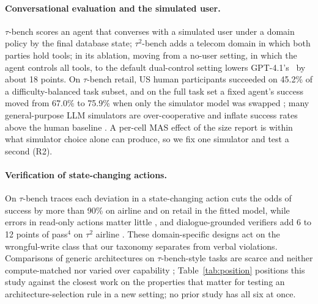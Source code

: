 \paragraph{Conversational evaluation and the simulated user.} $\tau$-bench \citep{yao2024tau} scores an agent that converses with a simulated user under a domain policy by the final database state; $\tau^2$-bench \citep{barres2025tau2} adds a telecom domain in which both parties hold tools; in its ablation, moving from a no-user setting, in which the agent controls all tools, to the default dual-control setting lowers GPT-4.1's \passone\ by about 18 points. On $\tau$-bench retail, US human participants succeeded on 45.2\% of a difficulty-balanced task subset, and on the full task set a fixed agent's success moved from 67.0\% to 75.9\% when only the simulator model was swapped \citep{seshadri2026lost}; many general-purpose LLM simulators are over-cooperative and inflate success rates above the human baseline \citep{zhou2026sim2real}. A per-cell MAS effect of the size \citet{kim2026capable} report is within what simulator choice alone can produce, so we fix one simulator and test a second (R2).

\paragraph{Verification of state-changing actions.} On $\tau$-bench traces each deviation in a state-changing action cuts the odds of success by more than 90\% on airline and on retail in the fitted model, while errors in read-only actions matter little \citep{cuadron2025saber}, and dialogue-grounded verifiers add 6 to 12 points of pass$^4$ on $\tau^2$ airline \citep{kang2026policyguard}. These domain-specific designs act on the wrongful-write class that our taxonomy separates from verbal violations. Comparisons of generic architectures on $\tau$-bench-style tasks are scarce and neither compute-matched nor varied over capability \citep{langchain2025bench}; Table~\ref{tab:position} positions this study against the closest work on the properties that matter for testing an architecture-selection rule in a new setting; no prior study has all six at once.


